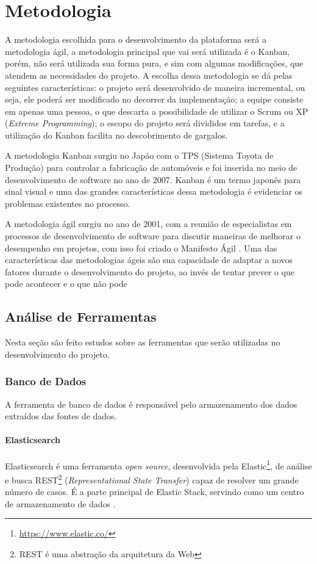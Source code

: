\chapter[Metodologia]{Metodologia}
A metodologia escolhida para o desenvolvimento da plataforma será a metodologia ágil, a metodologia principal que vai será utilizada é o Kanban, porém, não será utilizada sua forma pura, e sim com algumas modificações, que atendem as necessidades do projeto. A escolha dessa metodologia se dá pelas seguintes características: o projeto será desenvolvido de maneira incremental, ou seja, ele poderá ser modificado no decorrer da implementação; a equipe consiste em apenas uma pessoa, o que descarta a possibilidade de utilizar o Scrum ou XP (\textit{Extreme Programming}); o escopo do projeto será divididos em tarefas, e a utilização do Kanban facilita no descobrimento de gargalos.

A metodologia Kanban surgiu no Japão com o TPS (Sistema Toyota de Produção) \cite{tps} para controlar a fabricação de automóveis e foi inserida no meio de desenvolvimento de software no ano de 2007. Kanban é um termo japonês para sinal visual e uma das grandes características dessa metodologia é evidenciar os problemas existentes no processo. 

A metodologia ágil surgiu no ano de 2001, com a reunião de especialistas em processos de desenvolvimento de software para discutir maneiras de melhorar o desempenho em projetos, com isso foi criado o Manifesto Ágil \cite{agil}. Uma das características das metodologias ágeis são sua capacidade de adaptar a novos fatores durante o desenvolvimento do projeto, ao invés de tentar prever o que pode acontecer e o que não pode

\section{Análise de Ferramentas}
Nesta seção são feito estudos sobre as ferramentas que serão utilizadas no desenvolvimento do projeto.
\subsection{Banco de Dados}
A ferramenta de banco de dados é responsável pelo armazenamento dos dados extraídos das fontes de dados.
\subsubsection*{Elasticsearch}
Elasticsearch é uma ferramenta \textit{open source}, desenvolvida pela Elastic\footnote[1]{\url{https://www.elastic.co/}}, de análise e busca REST\footnote[2]{REST é uma abstração da arquitetura da Web} (\textit{Representational State Transfer}) capaz de resolver um grande número de casos. É a parte principal de Elastic Stack, servindo como um centro de armazenamento de dados \cite{elasticsearch}.

